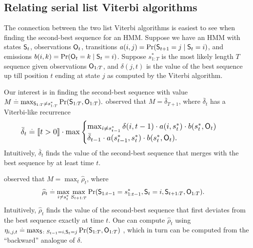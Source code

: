 %
\subsection{Relating serial list Viterbi algorithms}

The connection between the two list Viterbi algorithms is easiest to see when finding the second-best sequence for an HMM.
Suppose we have an HMM with states $\mathsf{S}_{t}$, observations $\mathsf{O}_{t}$, transitions $a(i, j) = \Pr( \mathsf{S}_{t+1} = j \mid \mathsf{S}_t = i )$, and emissions $b(i, k) = \Pr( \mathsf{O}_{t} = k \mid \mathsf{S}_t = i )$.
Suppose $s^*_{1:T}$ is the most likely length $T$ sequence given observations $\mathsf{O}_{1:T}$, and
$\delta(j, t)$ is the value of the best sequence up till position $t$ ending at state $j$ as computed by the Viterbi algorithm.

Our interest is in finding the second-best sequence %
with value
$ M \stackrel{.}{=} \max_{\mathsf{S}_{1:T} \neq s^*_{1 : T}}{\Pr( \mathsf{S}_{1:T}, \mathsf{O}_{1:T} )}. $
\citet{seshadri1994list} %
observed that $M = \bar{\delta}_{T+1}$, where $\bar{\delta}_t$ has a Viterbi-like recurrence
\begin{equation}
    \label{eqn:att-recurrence}
    \resizebox{0.9\linewidth}{!}{$
    \begin{aligned}
        \bar{\delta}_t &\defEq 
        \indicator{t > 0} \cdot
        \max
        \begin{cases}
        \max_{i \neq s^*_{t-1}} \delta(i, t-1) \cdot a( i, s^*_{t} ) \cdot b( s^*_{t}, \OSf_{t} ) \\
        \bar{\delta}_{t - 1} \cdot a( s^*_{t - 1}, s^*_{t} ) \cdot b( s^*_{t}, \OSf_{t} ).
        \end{cases}%
    \end{aligned}
    $}
\end{equation}
Intuitively, $\bar{\delta}_t$ finds the value of the second-best sequence that merges with the best sequence by at least time $t$.


\citet{nilsson2001sequentially} observed that $M = \max_t \widehat{\rho}_t$, where
\begin{align*}
	\widehat{\rho}_{t} &\stackrel{.}{=} \max_{i \neq s^*_{t}} \max_{S_{t+1:T}} {\Pr( \mathsf{S}_{1:t-1} = s^*_{1:t-1}, \mathsf{S}_t = i, \mathsf{S}_{t+1:T}, \mathsf{O}_{1:T} )}.
\end{align*}
Intuitively, $\widehat{\rho}_t$ finds the value of the second-best sequence that first deviates from the best sequence exactly at time $t$.
One can compute $\widehat{\rho}_{t}$ using $\eta_{i, j, t} \stackrel{.}{=} \max_{\mathsf{S} \colon S_{t - 1} = i, \mathsf{S}_{t} = j} \Pr( \mathsf{S}_{1:T}, \mathsf{O}_{1:T} )$ \citep{nilsson2001sequentially},
which in turn can be computed from the ``backward'' analogue of $\delta$.

